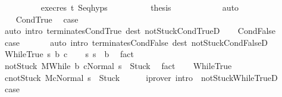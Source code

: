 \begin{isabellebody}
\ \ \ \ \ \ \ \ \isamarkupfalse%
\ exec{\isacharunderscore}res\ t{\isacharprime}\ Seq{\isachardot}hyps\isanewline
\ \ \ \ \ \ \ \ \isamarkupfalse%
\ {\isacharquery}thesis\isanewline
\ \ \ \ \ \ \ \ \ \ \isamarkupfalse%
\ auto\isanewline
\ \ \ \ \ \ \isamarkupfalse%
\isanewline
\ \ \ \ \isamarkupfalse%
\isanewline
\ \ \isamarkupfalse%
\isanewline
{}\isamarkupfalse%
\isanewline
\ \ \isamarkupfalse%
\ CondTrue\ \isamarkupfalse%
\ {\isacharquery}case\ \isanewline
\ \ \ \ \isamarkupfalse%
\ {\isacharparenleft}auto\ intro{\isacharcolon}\ terminates{\isachardot}CondTrue\ dest{\isacharcolon}\ notStuck{\isacharunderscore}CondTrueD{\isacharparenright}\isanewline
{}\isamarkupfalse%
\isanewline
\ \ \isamarkupfalse%
\ CondFalse\ \isamarkupfalse%
\ {\isacharquery}case\ \isanewline
\ \ \ \ \isamarkupfalse%
\ {\isacharparenleft}auto\ intro{\isacharcolon}\ terminates{\isachardot}CondFalse\ dest{\isacharcolon}\ notStuck{\isacharunderscore}CondFalseD{\isacharparenright}\isanewline
{}\isamarkupfalse%
\isanewline
\ \ \isamarkupfalse%
\ {\isacharparenleft}WhileTrue\ s\ b\ c{\isacharparenright}\isanewline
\ \ \isamarkupfalse%
\ s{\isacharcolon}\ {\isachardoublequoteopen}s\ {\isasymin}\ b{\isachardoublequoteclose}\ \isamarkupfalse%
\ fact\isanewline
\ \ \isamarkupfalse%
\ not{\isacharunderscore}Stuck{\isacharcolon}\ {\isachardoublequoteopen}{\isasymGamma}{\isacharbar}\isactrlbsub M\isactrlesub {\isasymturnstile}{\isasymlangle}While\ b\ c{\isacharcomma}Normal\ s\ {\isasymrangle}\ {\isasymRightarrow}{\isasymnotin}{\isacharbraceleft}Stuck{\isacharbraceright}{\isachardoublequoteclose}\ \isamarkupfalse%
\ fact\isanewline
\ \ \isamarkupfalse%
\ WhileTrue\ \isamarkupfalse%
\ c{\isacharunderscore}notStuck{\isacharcolon}\ {\isachardoublequoteopen}{\isasymGamma}{\isacharbar}\isactrlbsub M\isactrlesub {\isasymturnstile}{\isasymlangle}c{\isacharcomma}Normal\ s\ {\isasymrangle}\ {\isasymRightarrow}{\isasymnotin}{\isacharbraceleft}Stuck{\isacharbraceright}{\isachardoublequoteclose}\isanewline
\ \ \ \ \isamarkupfalse%
\ {\isacharparenleft}iprover\ intro{\isacharcolon}\ \ notStuck{\isacharunderscore}WhileTrueD{}{\isacharparenright}\isanewline
\ \ \isamarkupfalse%
\ {\isacharquery}case\isanewline
\ \ \isamarkupfalse%

\end{isabellebody}
